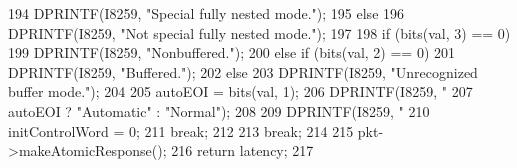 \begin{DoxyCode}
{{{{194                 DPRINTF(I8259, "Special fully nested mode.\n");
195             } else {
196                 DPRINTF(I8259, "Not special fully nested mode.\n");
197             }
198             if (bits(val, 3) == 0) {
199                 DPRINTF(I8259, "Nonbuffered.\n");
200             } else if (bits(val, 2) == 0) {
201                 DPRINTF(I8259, "Buffered.\n");
202             } else {
203                 DPRINTF(I8259, "Unrecognized buffer mode.\n");
204             }
205             autoEOI = bits(val, 1);
206             DPRINTF(I8259, "%
207                     autoEOI ? "Automatic" : "Normal");
208 
209             DPRINTF(I8259, "%
210             initControlWord = 0;
211             break;
212         }
213         break;
214     }
215     pkt->makeAtomicResponse();
216     return latency;
217 }
\end{DoxyCode}


